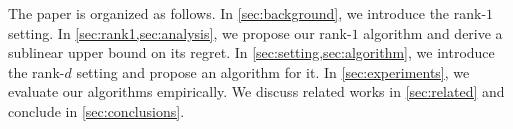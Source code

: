 The paper is organized as follows. In \cref{sec:background}, we introduce the rank-$1$ setting. In \cref{sec:rank1,sec:analysis}, we propose our rank-$1$ algorithm and derive a sublinear upper bound on its regret. In \cref{sec:setting,sec:algorithm}, we introduce the rank-$d$ setting and propose an algorithm for it. In \cref{sec:experiments}, we evaluate our algorithms empirically. We discuss related works in \cref{sec:related} and conclude in \cref{sec:conclusions}. 
